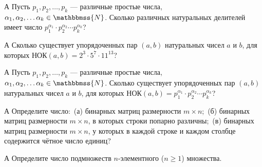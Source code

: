 \begin{problemList}
\problemItemSimple
{А}
{Пусть $p_{1}, p_{2}, \dots, p_{k}$ --- различные простые числа, $\alpha_{1}, \alpha_{2}, \dots \alpha_{k} \in \mathbbmss{N}$. Сколько различных натуральных делителей имеет число $p_{1} ^{\alpha_{1}} \cdot p_{2} ^{\alpha_{2}} \cdots p_{k} ^{\alpha_{k}}$?}

\problemItemSimple
{А}
{Сколько существует упорядоченных пар $(a,b)$ натуральных чисел $a$ и $b$, для которых $\text{НОК}(a,b) = 2^{3} \cdot 5^{7}\cdot 11^{13}$?}

\problemItemSimple
{А}
{Пусть $p_{1}, p_{2}, \dots, p_{k}$ --- различные простые числа, $\alpha_{1}, \alpha_{2}, \dots \alpha_{k} \in \mathbbmss{N}$. Сколько существует упорядоченных пар $(a,b)$ натуральных чисел $a$ и $b$, для которых $\text{НОК}(a,b) =p_{1} ^{\alpha_{1}} \cdot p_{2} ^{\alpha_{2}} \cdots p_{k} ^{\alpha_{k}}$?}

\problemItemSimple
{А}
{Определите число:~(а) бинарных матриц размерности $m \times n$;~(б) бинарных матриц размерности $m \times n$, в которых строки попарно различны;~(в) бинарных матриц размерности $m \times n$, у которых в каждой строке и каждом столбце содержится чётное число единиц?}

\problemItemSimple
{А}
{Определите число подмножеств $n$-элементного ($n \ge 1$) множества.}

\end{problemList}

